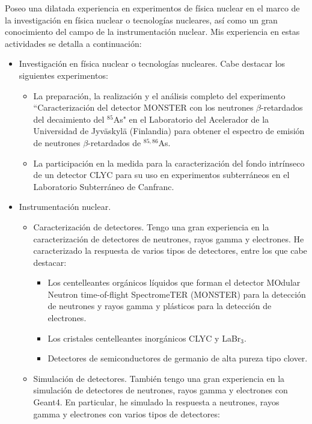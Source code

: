 \documentclass[changecolor={240, 95, 64}]{cv}
\begin{document}
Poseo una dilatada experiencia en experimentos de física nuclear en el marco de la investigación en física nuclear o tecnologías nucleares, así como un gran conocimiento del campo de la instrumentación nuclear. Mis experiencia en estas actividades se detalla a continuación:

\begin{itemize}
  \item Investigación en física nuclear o tecnologías nucleares. Cabe destacar los siguientes experimentos:
        \begin{itemize}
          \item La preparación, la realización y el análisis completo del experimento ``Caracterización del detector MONSTER con los neutrones $\beta$-retardados del decaimiento del $^{85}$As" en el Laboratorio del Acelerador de la Universidad de Jyväskylä (Finlandia) para obtener el espectro de emisión de neutrones $\beta$-retardados de $^{85,86}$As.
          \item La participación en la medida para la caracterización del fondo intrínseco de un detector CLYC para su uso en experimentos subterráneos en el Laboratorio Subterráneo de Canfranc.
        \end{itemize}
  \item Instrumentación nuclear.
        \begin{itemize}
          \item Caracterización de detectores. Tengo una gran experiencia en la caracterización de detectores de neutrones, rayos gamma y electrones. He caracterizado la respuesta de varios tipos de detectores, entre los que cabe destacar:
                \begin{itemize}
                  \item Los centelleantes orgánicos líquidos que forman el detector MOdular Neutron time-of-flight SpectromeTER (MONSTER) para la detección de neutrones y rayos gamma y plásticos para la detección de electrones.
                  \item Los cristales centelleantes inorgánicos CLYC y LaBr$_3$.
                  \item Detectores de semiconductores de germanio de alta pureza tipo clover.
                \end{itemize}
          \item Simulación de detectores. También tengo una gran experiencia en la simulación de detectores de neutrones, rayos gamma y electrones con Geant4. En particular, he simulado la respuesta a neutrones, rayos gamma y electrones con varios tipos de detectores:

\end{itemize}
\end{itemize}
\end{document}
